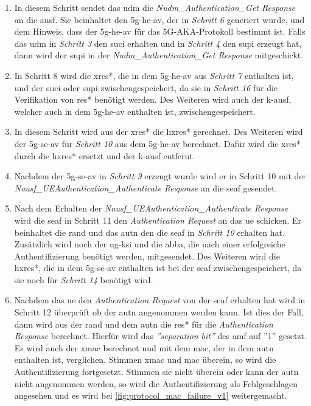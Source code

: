 \begin{enumerate}
\item In diesem Schritt sendet das \gls{udm} die \textit{Nudm\_Authentication\_Get Response} an die \gls{ausf}.
Sie beinhaltet den \gls{5g-he-av}, der in \textit{Schritt 6} generiert wurde, und dem Hinweis, dass der \gls{5g-he-av} f\"ur das 5G-AKA-Protokoll bestimmt ist.
Falls das \gls{udm} in \textit{Schritt 3} den \gls{suci} erhalten und in \textit{Schritt 4} den \gls{supi} erzeugt hat, dann wird der \gls{supi} in der \textit{Nudm\_Authentication\_Get Response} mitgeschickt.

\item In Schritt 8 wird die \gls{xres*}, die in dem \gls{5g-he-av} aus \textit{Schritt 7} enthalten ist, und der \gls{suci} oder \gls{supi} zwischengespeichert, da sie in \textit{Schritt 16} f\"ur die Verifikation von \gls{res*} ben\"otigt werden.
Des Weiteren wird auch der \gls{k-ausf}, welcher auch in dem \gls{5g-he-av} enthalten ist, zwischengespeichert.

\item In diesem Schritt wird aus der \gls{xres*} die \gls{hxres*} gerechnet.
Des Weiteren wird der \gls{5g-se-av} f\"ur \textit{Schritt 10} aus dem \gls{5g-he-av} berechnet.
Daf\"ur wird die \gls{xres*} durch die \gls{hxres*} ersetzt und der \gls{k-ausf} entfernt.

\item Nachdem der \gls{5g-se-av} in \textit{Schritt 9} erzeugt wurde wird er in Schritt 10 mit der \textit{Nausf\_UEAuthentication\_Authenticate Response} an die \gls{seaf} gesendet.

\item Nach dem Erhalten der \textit{Nausf\_UEAuthentication\_Authenticate Response} wird die \gls{seaf} in Schritt 11 den \textit{Authentication Request}  an das \gls{ue} schicken.
Er beinhaltet die \gls{rand} und das \gls{autn} den die \gls{seaf} in \textit{Schritt 10} erhalten hat.
Zus\"atzlich wird noch der \gls{ng-ksi} und die \gls{abba}, die nach einer erfolgreiche Authentifizierung ben\"otigt werden, mitgesendet.
Des Weiteren wird die \gls{hxres*}, die in dem \gls{5g-se-av} enthalten ist bei der \gls{seaf} zwischengespeichert, da sie noch f\"ur \textit{Schritt 14} ben\"otigt wird.

\item Nachdem das \gls{ue} den \textit{Authentication Request} von der \gls{seaf} erhalten hat wird in Schritt 12 \"uberpr\"uft ob der \gls{autn} angenommen werden kann.
Ist dies der Fall, dann wird aus der \gls{rand} und dem \gls{autn} die \gls{res*} f\"ur die \textit{Authentication Response} berechnet.
Hierf\"ur wird das \textit{''separation bit''} des \gls{amf} auf ''1'' gesetzt.
Es wird auch der \gls{xmac} berechnet und mit dem \gls{mac}, der in dem \gls{autn} enthalten ist, verglichen.
Stimmen \gls{xmac} und \gls{mac} \"uberein, so wird die Authentifizierung fortgesetzt.
Stimmen sie nicht \"uberein oder kann der \gls{autn} nicht angenommen werden, so wird die Authentifizierung als Fehlgeschlagen angesehen und es wird bei \cref{fig:protocol_mac_failure_v1} weitergemacht.


\end{enumerate}
